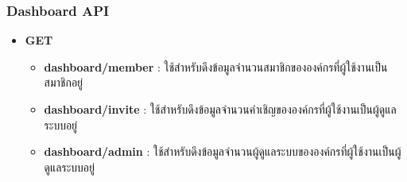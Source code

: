\subsubsection{Dashboard API}

\ifenglish
\else
\begin{itemize}
    \item \textbf{GET}
    \begin{itemize}
        \item \textbf{dashboard/member} : ใช้สำหรับดึงข้อมูลจำนวนสมาชิกขององค์กรที่ผู้ใช้งานเป็นสมาชิกอยู่
        \item \textbf{dashboard/invite} : ใช้สำหรับดึงข้อมูลจำนวนคำเชิญขององค์กรที่ผู้ใช้งานเป็นผู้ดูแลระบบอยู่
        \item \textbf{dashboard/admin} : ใช้สำหรับดึงข้อมูลจำนวนผู้ดูแลระบบขององค์กรที่ผู้ใช้งานเป็นผู้ดูแลระบบอยู่
    \end{itemize}
\end{itemize}
\fi

\clearpage